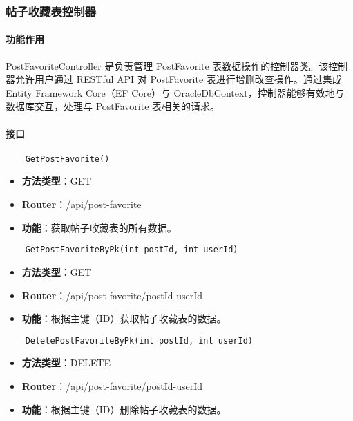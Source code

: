 \subsubsection{帖子收藏表控制器}

\paragraph{功能作用}

PostFavoriteController 是负责管理 PostFavorite 表数据操作的控制器类。该控制器允许用户通过 RESTful API 对 PostFavorite 表进行增删改查操作。通过集成 Entity Framework Core（EF Core）与 OracleDbContext，控制器能够有效地与数据库交互，处理与 PostFavorite 表相关的请求。

\paragraph{接口}

\begin{verbatim}
	GetPostFavorite()
\end{verbatim}

\begin{itemize}
	\item \textbf{方法类型}：GET
	\item \textbf{Router}：/api/post-favorite
	\item \textbf{功能}：获取帖子收藏表的所有数据。
\end{itemize}

\begin{verbatim}
	GetPostFavoriteByPk(int postId, int userId)
\end{verbatim}

\begin{itemize}
	\item \textbf{方法类型}：GET
	\item \textbf{Router}：/api/post-favorite/{postId}-{userId}
	\item \textbf{功能}：根据主键（ID）获取帖子收藏表的数据。
\end{itemize}

\begin{verbatim}
	DeletePostFavoriteByPk(int postId, int userId)
\end{verbatim}

\begin{itemize}
	\item \textbf{方法类型}：DELETE
	\item \textbf{Router}：/api/post-favorite/{postId}-{userId}
	\item \textbf{功能}：根据主键（ID）删除帖子收藏表的数据。
\end{itemize}


